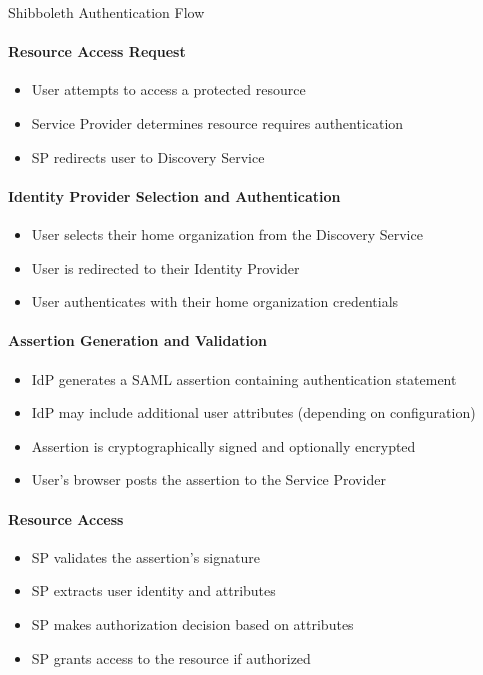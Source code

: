 \begin{KR}{Shibboleth Authentication Flow}
\paragraph{Resource Access Request}
\begin{itemize}
    \item User attempts to access a protected resource
    \item Service Provider determines resource requires authentication
    \item SP redirects user to Discovery Service
\end{itemize}

\paragraph{Identity Provider Selection and Authentication}
\begin{itemize}
    \item User selects their home organization from the Discovery Service
    \item User is redirected to their Identity Provider
    \item User authenticates with their home organization credentials
\end{itemize}

\paragraph{Assertion Generation and Validation}
\begin{itemize}
    \item IdP generates a SAML assertion containing authentication statement
    \item IdP may include additional user attributes (depending on configuration)
    \item Assertion is cryptographically signed and optionally encrypted
    \item User's browser posts the assertion to the Service Provider
\end{itemize}

\paragraph{Resource Access}
\begin{itemize}
    \item SP validates the assertion's signature
    \item SP extracts user identity and attributes
    \item SP makes authorization decision based on attributes
    \item SP grants access to the resource if authorized
\end{itemize}
\end{KR}


